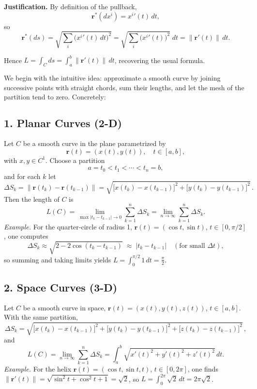 \documentclass[11pt,openany]{article}
\begin{document}
\bigskip

\noindent\textbf{Justification.}  By definition of the pullback,
\[
\mathbf r^*(dx^i)=x^i{}'(t)\,dt,
\]
so
\[
\mathbf r^*(ds)
=\sqrt{\sum_i\bigl(x^i{}'(t)\,dt\bigr)^2}
=\sqrt{\sum_i\bigl(x^i{}'(t)\bigr)^2}\;dt
=\|\mathbf r'(t)\|\,dt.
\]

\noindent Hence 
\(\displaystyle L=\int_C ds=\int_a^b\|\mathbf r'(t)\|\,dt\), 
recovering the usual formula.  


\newpage

We begin with the intuitive idea: approximate a smooth curve by joining successive points with straight chords, sum their lengths, and let the mesh of the partition tend to zero.  Concretely:

\bigskip

\subsection*{1. Planar Curves (2-D)}

Let \(C\) be a smooth curve in the plane parametrized by 
\[
\mathbf r(t)=(x(t),y(t)),\quad t\in[a,b],
\]
with \(x,y\in C^1\).  Choose a partition
\[
a=t_0<t_1<\cdots<t_n=b,
\]
and for each \(k\) let
\[
\Delta S_k
=\bigl\|\mathbf r(t_k)-\mathbf r(t_{k-1})\bigr\|
=\sqrt{\bigl[x(t_k)-x(t_{k-1})\bigr]^2
	+\bigl[y(t_k)-y(t_{k-1})\bigr]^2}\,.
\]
Then the length of \(C\) is
\[
L(C)
=\lim_{\max|t_k-t_{k-1}|\to0}
\sum_{k=1}^n\Delta S_k
=\lim_{n\to\infty}\sum_{k=1}^n\Delta S_k.
\]
\emph{Example.}  For the quarter‐circle of radius 1,
\(\mathbf r(t)=(\cos t,\sin t)\), \(t\in[0,\pi/2]\), one computes
\[
\Delta S_k
\approx\sqrt{2-2\cos(t_k-t_{k-1})}
\;\approx\;|t_k-t_{k-1}|
\quad(\text{for small }\Delta t),
\]
so summing and taking limits yields
\(\displaystyle L=\int_0^{\pi/2}1\,dt=\frac\pi2\).

\bigskip

\subsection*{2. Space Curves (3-D)}

Let \(C\) be a smooth curve in space,
\(\mathbf r(t)=(x(t),y(t),z(t))\), \(t\in[a,b]\).  With the same partition,
\[
\Delta S_k
=\sqrt{\bigl[x(t_k)-x(t_{k-1})\bigr]^2
	+\bigl[y(t_k)-y(t_{k-1})\bigr]^2
	+\bigl[z(t_k)-z(t_{k-1})\bigr]^2}\,,
\]
and 
\[
L(C)
=\lim_{n\to\infty}\sum_{k=1}^n\Delta S_k
=\int_a^b\sqrt{x'(t)^2+y'(t)^2+z'(t)^2}\,dt.
\]
\emph{Example.}  For the helix 
\(\mathbf r(t)=(\cos t,\sin t,t)\), \(t\in[0,2\pi]\), one finds
\(\|\mathbf r'(t)\|=\sqrt{\sin^2t+\cos^2t+1}=\sqrt2\),
so \(L=\int_0^{2\pi}\!\sqrt2\,dt=2\pi\sqrt2\).
\end{document}
